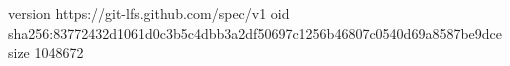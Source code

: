 version https://git-lfs.github.com/spec/v1
oid sha256:83772432d1061d0c3b5c4dbb3a2df50697c1256b46807c0540d69a8587be9dce
size 1048672
